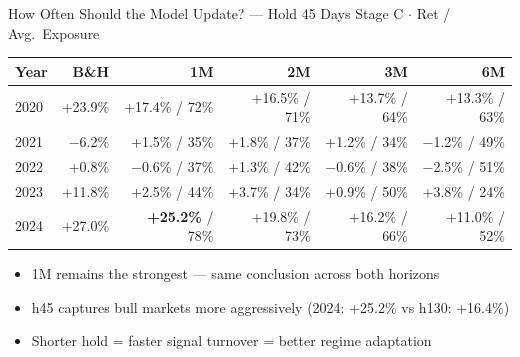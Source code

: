 \documentclass[aspectratio=169]{beamer}
\begin{document}
\begin{frame}{How Often Should the Model Update? — Hold 45 Days}
  \small
  Stage C $\cdot$ Ret / Avg.\ Exposure

  \vspace{0.4em}
  \begin{tabular}{lrrrrr}
    \toprule
    Year & B\&H & 1M & 2M & 3M & 6M \\
    \midrule
    2020 & +23.9\% & +17.4\% / 72\% & +16.5\% / 71\% & +13.7\% / 64\% & +13.3\% / 63\% \\
    2021 & $-$6.2\%  & +1.5\% / 35\% & +1.8\% / 37\% & +1.2\% / 34\% & $-$1.2\% / 49\% \\
    2022 & +0.8\%  & $-$0.6\% / 37\% & +1.3\% / 42\% & $-$0.6\% / 38\% & $-$2.5\% / 51\% \\
    2023 & +11.8\% & +2.5\% / 44\% & +3.7\% / 34\% & +0.9\% / 50\% & +3.8\% / 24\% \\
    2024 & +27.0\% & \textbf{+25.2\%} / 78\% & +19.8\% / 73\% & +16.2\% / 66\% & +11.0\% / 52\% \\
    \bottomrule
  \end{tabular}

  \vspace{0.5em}
  \begin{itemize}
    \item 1M remains the strongest — same conclusion across both horizons
    \item h45 captures bull markets more aggressively (2024: +25.2\% vs h130: +16.4\%)
    \item Shorter hold = faster signal turnover = better regime adaptation
  \end{itemize}
\end{frame}
\end{document}

